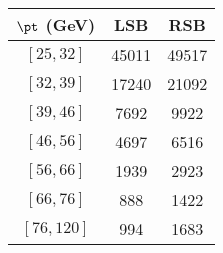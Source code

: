 \begin{tabular}{c||c|c}
$\pt$ (GeV) & LSB & RSB  \\
\hline
$[25, 32]$ & 45011 & 49517\\
$[32, 39]$ & 17240 & 21092\\
$[39, 46]$ & 7692 & 9922\\
$[46, 56]$ & 4697 & 6516\\
$[56, 66]$ & 1939 & 2923\\
$[66, 76]$ & 888 & 1422\\
$[76, 120]$ & 994 & 1683\\
\end{tabular}
